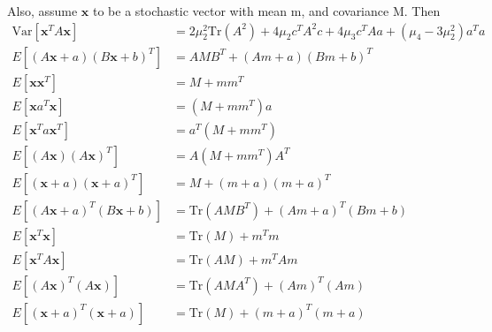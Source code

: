 Also, assume $\mathbf{x}$ to be a stochastic vector with mean m, and covariance M.
Then
\begin{align*}
   \text{Var}[\mathbf{x}^T A\mathbf{x}] &= 2\mu_2^2\text{Tr}(A^2) + 4\mu_2 c^T A^2 c + 4\mu_3 c^T Aa + (\mu_4 - 3\mu_2^2)a^T a \tag{319} \\
   E[(A\mathbf{x} + a)(B\mathbf{x} + b)^T] &= AMB^T + (Am + a)(Bm + b)^T \tag{320} \\
   E[\mathbf{x}\mathbf{x}^T] &= M + mm^T \tag{321} \\
   E[\mathbf{x} a^T \mathbf{x}] &= (M + mm^T)a \tag{322} \\
   E[\mathbf{x}^T a\mathbf{x}^T] &= a^T(M + mm^T) \tag{323} \\
   E[(A\mathbf{x})(A\mathbf{x})^T] &= A(M + mm^T)A^T \tag{324} \\
   E[(\mathbf{x} + a)(\mathbf{x} + a)^T] &= M + (m + a)(m + a)^T \tag{325} \\
   E[(A\mathbf{x} + a)^T(B\mathbf{x} + b)] &= \text{Tr}(AMB^T) + (Am + a)^T(Bm + b) \tag{326} \\
   E[\mathbf{x}^T \mathbf{x}] &= \text{Tr}(M) + m^T m \tag{327} \\
   E[\mathbf{x}^T A\mathbf{x}] &= \text{Tr}(AM) + m^T Am \tag{328} \\
   E[(A\mathbf{x})^T(A\mathbf{x})] &= \text{Tr}(AMA^T) + (Am)^T(Am) \tag{329} \\
   E[(\mathbf{x} + a)^T(\mathbf{x} + a)] &= \text{Tr}(M) + (m + a)^T(m + a) \tag{330}
\end{align*}

